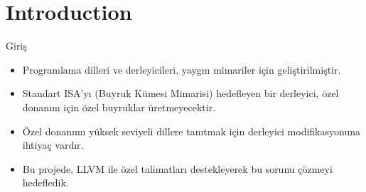\section{Introduction}
\begin{frame}{Giriş}
\begin{itemize}
        \item Programlama dilleri ve derleyicileri, yaygın mimariler için geliştirilmiştir.
        \item Standart ISA'yı (Buyruk Kümesi Mimarisi) hedefleyen bir derleyici, özel donanım için özel buyruklar üretmeyecektir.
	\item Özel donanımı yüksek seviyeli dillere tanıtmak için derleyici modifikasyonuna ihtiyaç vardır.
	\item Bu projede, LLVM ile özel talimatları destekleyerek bu sorunu çözmeyi hedefledik.
    \end{itemize}

\end{frame}
